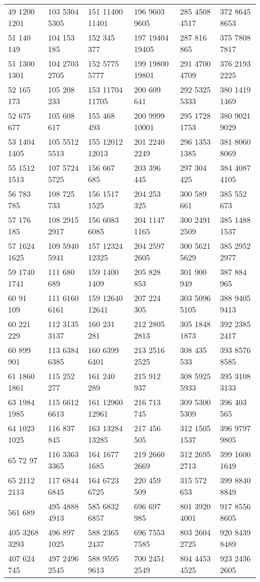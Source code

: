 \begin{center}
\begin{longtable}[c]{llllll}
49 1200 1201&103 5304 5305&151 11400 11401&196 9603 9605&285 4508 4517&372 8645 8653\\
51 140 149&104 153 185&152 345 377&197 19404 19405&287 816 865&375 7808 7817\\
51 1300 1301&104 2703 2705&152 5775 5777&199 19800 19801&291 4700 4709&376 2193 2225\\
52 165 173&105 208 233&153 11704 11705&200 609 641&292 5325 5333&380 1419 1469\\
52 675 677&105 608 617&155 468 493&200 9999 10001&295 1728 1753&380 9021 9029\\
53 1404 1405&105 5512 5513&155 12012 12013&201 2240 2249&296 1353 1385&381 8060 8069\\
55 1512 1513&107 5724 5725&156 667 685&203 396 445&297 304 425&384 4087 4105\\
56 783 785&108 725 733&156 1517 1525&204 253 325&300 589 661&385 552 673\\
57 176 185&108 2915 2917&156 6083 6085&204 1147 1165&300 2491 2509&385 1488 1537\\
57 1624 1625&109 5940 5941&157 12324 12325&204 2597 2605&300 5621 5629&385 2952 2977\\
59 1740 1741&111 680 689&159 1400 1409&205 828 853&301 900 949&387 884 965\\
60 91 109&111 6160 6161&159 12640 12641&207 224 305&303 5096 5105&388 9405 9413\\
60 221 229&112 3135 3137&160 231 281&212 2805 2813&305 1848 1873&392 2385 2417\\
60 899 901&113 6384 6385&160 6399 6401&213 2516 2525&308 435 533&393 8576 8585\\
61 1860 1861&115 252 277&161 240 289&215 912 937&308 5925 5933&395 3108 3133\\
63 1984 1985&115 6612 6613&161 12960 12961&216 713 745&309 5300 5309&396 403 565\\
64 1023 1025&116 837 845&163 13284 13285&217 456 505&312 1505 1537&396 9797 9805\\
65 72 97&116 3363 3365&164 1677 1685&219 2660 2669&312 2695 2713&399 1600 1649\\
65 2112 2113&117 6844 6845&164 6723 6725&220 459 509&315 572 653&399 8840 8849\\
\pagebreak
400 561 689&495 4888 4913&585 6832 6857&696 697 985&801 3920 4001&917 8556 8605\\
405 3268 3293&496 897 1025&588 2365 2437&696 7553 7585&803 2604 2725&920 8439 8489\\
407 624 745&497 2496 2545&588 9595 9613&700 2451 2549&804 4453 4525&923 2436 2605\\

\end{longtable}
\end{center}
